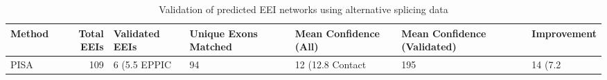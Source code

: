 \begin{table}
\caption{Validation of predicted EEI networks using alternative splicing data}
\begin{tabular}{lrlllll}
\toprule
Method & Total EEIs & Validated EEIs & Unique Exons Matched & Mean Confidence (All) & Mean Confidence (Validated) & Improvement \\
\midrule
PISA & 109 & 6 (5.5%
EPPIC & 94 & 12 (12.8%
Contact & 195 & 14 (7.2%
\bottomrule
\end{tabular}
\end{table}
